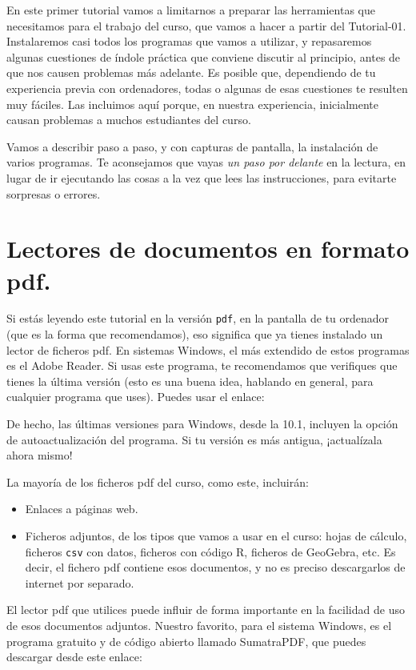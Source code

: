 \documentclass[10pt,a4paper]{article}\usepackage[]{graphicx}\usepackage[]{color}
\newcounter {cont01}
\begin{document}
En este primer tutorial vamos a limitarnos a preparar las herramientas que necesitamos para el
trabajo del curso, que vamos a hacer a partir del Tutorial-01. Instalaremos casi todos los
programas que vamos a utilizar, y repasaremos algunas cuestiones de índole práctica que conviene
discutir al principio, antes de que nos causen problemas más adelante. Es posible que, dependiendo
de tu experiencia previa con ordenadores, todas o algunas de esas cuestiones te resulten muy
fáciles. Las incluimos aquí porque, en nuestra experiencia, inicialmente causan problemas a muchos
estudiantes del curso.

Vamos a describir paso a paso, y con capturas de pantalla, la instalación de varios programas. Te
aconsejamos que vayas {\em un paso por delante} en la lectura, en lugar de ir ejecutando las cosas
a la vez que lees las instrucciones, para evitarte sorpresas o errores.

\section{Lectores de documentos en formato pdf.}
\label{tut00:sec:LectoresPdf}

Si estás leyendo este tutorial en la versión {\tt pdf}, en la pantalla de tu ordenador (que es la
forma que recomendamos), eso significa que ya tienes instalado un lector de ficheros pdf. En
sistemas Windows, el más extendido de estos programas es el Adobe Reader. Si usas este programa, te
recomendamos que verifiques que tienes la última versión (esto es una buena idea, hablando en
general, para cualquier programa que uses). Puedes usar el enlace:
\begin{center}
\end{center}
De hecho, las últimas versiones para Windows, desde la 10.1, incluyen la opción de
autoactualización del programa. Si tu versión es más antigua, ¡actualízala ahora mismo!

La mayoría de los ficheros pdf del curso, como este, incluirán:
\begin{itemize}
  \item Enlaces a páginas web.
  \item Ficheros adjuntos, de los tipos que vamos a usar en el curso: hojas de cálculo, ficheros
      {\tt csv}  con datos, ficheros con código R, ficheros de GeoGebra, etc.  Es decir, el
      fichero pdf contiene esos documentos, y no es preciso descargarlos de internet por
      separado.
\end{itemize}
El lector pdf que utilices puede influir de forma importante en la facilidad de uso de esos
documentos adjuntos. Nuestro favorito, para el sistema Windows, es el programa gratuito y de código
abierto llamado SumatraPDF, que puedes descargar desde este enlace:
\begin{center}
\end{center}
\end{document}
